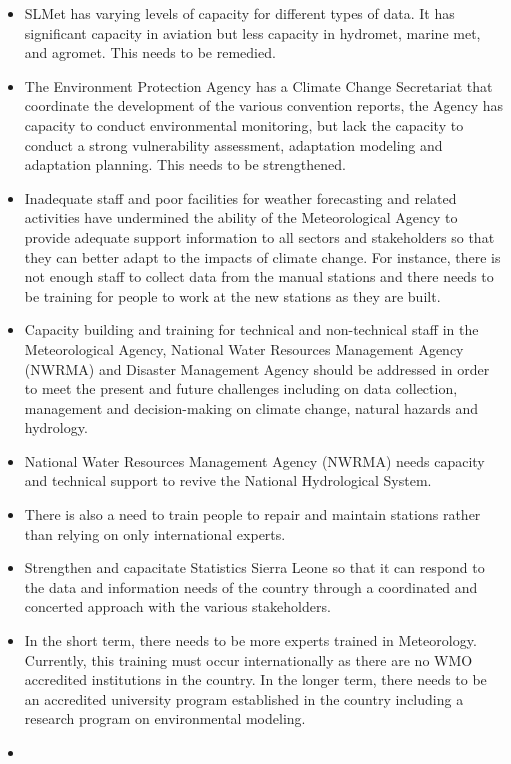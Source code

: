 \documentclass[
]{book}
\begin{document}
\begin{itemize}
\item
  SLMet has varying levels of capacity for different types of data. It has significant capacity in aviation but less capacity in hydromet, marine met, and agromet. This needs to be remedied.
\item
  The Environment Protection Agency has a Climate Change Secretariat that coordinate the development of the various convention reports, the Agency has capacity to conduct environmental monitoring, but lack the capacity to conduct a strong vulnerability assessment, adaptation modeling and adaptation planning. This needs to be strengthened.
\item
  Inadequate staff and poor facilities for weather forecasting and related activities have undermined the ability of the Meteorological Agency to provide adequate support information to all sectors and stakeholders so that they can better adapt to the impacts of climate change. For instance, there is not enough staff to collect data from the manual stations and there needs to be training for people to work at the new stations as they are built.
\item
  Capacity building and training for technical and non-technical staff in the Meteorological Agency, National Water Resources Management Agency (NWRMA) and Disaster Management Agency should be addressed in order to meet the present and future challenges including on data collection, management and decision-making on climate change, natural hazards and hydrology.
\item
  National Water Resources Management Agency (NWRMA) needs capacity and technical support to revive the National Hydrological System.
\item
  There is also a need to train people to repair and maintain stations rather than relying on only international experts.
\item
  Strengthen and capacitate Statistics Sierra Leone so that it can respond to the data and information needs of the country through a coordinated and concerted approach with the various stakeholders.
\item
  In the short term, there needs to be more experts trained in Meteorology. Currently, this training must occur internationally as there are no WMO accredited institutions in the country. In the longer term, there needs to be an accredited university program established in the country including a research program on environmental modeling.
\item

\end{itemize}
\end{document}
